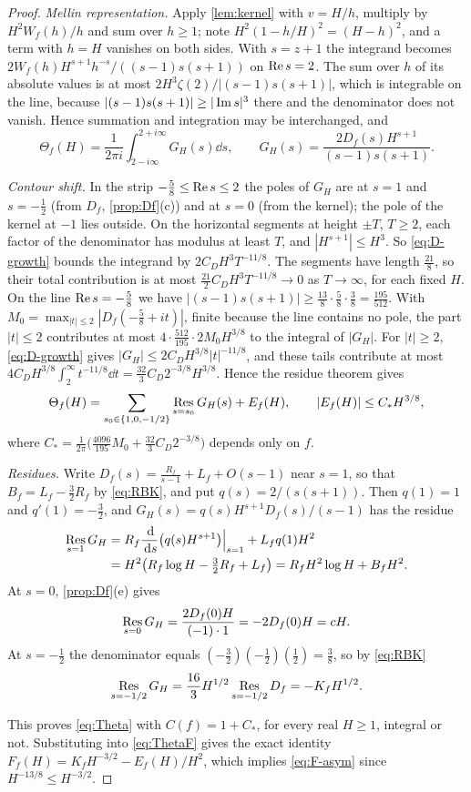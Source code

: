 \begin{proof}
\emph{Mellin representation.} Apply \cref{lem:kernel} with $v=H/h$, multiply by $H^2W_f(h)/h$ and sum over $h\ge1$; note $H^2(1-h/H)^2=(H-h)^2$, and a term with $h=H$ vanishes on both sides. With $s=z+1$ the integrand becomes $2W_f(h)H^{s+1}h^{-s}/((s-1)s(s+1))$ on $\operatorname{Re} s=2$. The sum over $h$ of its absolute values is at most $2H^3\zeta(2)/|(s-1)s(s+1)|$, which is integrable on the line, because $|(s-1)s(s+1)|\ge|\operatorname{Im} s|^3$ there and the denominator does not vanish. Hence summation and integration may be interchanged, and
\[
\Theta_f(H)=\frac1{2\pi i}\int_{2-i\infty}^{2+i\infty}G_H(s)\dd s,\qquad G_H(s)=\frac{2D_f(s)H^{s+1}}{(s-1)s(s+1)}.
\]

\emph{Contour shift.} In the strip $-\frac58\le\operatorname{Re} s\le2$ the poles of $G_H$ are at $s=1$ and $s=-\frac12$ (from $D_f$, \cref{prop:Df}(c)) and at $s=0$ (from the kernel); the pole of the kernel at $-1$ lies outside. On the horizontal segments at height $\pm T$, $T\ge2$, each factor of the denominator has modulus at least $T$, and $|H^{s+1}|\le H^3$. So \eqref{eq:D-growth} bounds the integrand by $2C_DH^3T^{-11/8}$. The segments have length $\frac{21}8$, so their total contribution is at most $\frac{21}2C_DH^3T^{-11/8}\to0$ as $T\to\infty$, for each fixed $H$. On the line $\operatorname{Re} s=-\frac58$ we have $|(s-1)s(s+1)|\ge\frac{13}8\cdot\frac58\cdot\frac38=\frac{195}{512}$. With $M_0=\max_{|t|\le2}|D_f(-\frac58+it)|$, finite because the line contains no pole, the part $|t|\le2$ contributes at most $4\cdot\frac{512}{195}\cdot2M_0H^{3/8}$ to the integral of $|G_H|$. For $|t|\ge2$, \eqref{eq:D-growth} gives $|G_H|\le2C_DH^{3/8}|t|^{-11/8}$, and these tails contribute at most $4C_DH^{3/8}\int_2^\infty t^{-11/8}\dd t=\frac{32}3C_D2^{-3/8}H^{3/8}$. Hence the residue theorem gives
\[
\Theta_f(H)=\sum_{s_0\in\{1,0,-1/2\}}\operatorname*{Res}_{s=s_0}G_H(s)+E_f(H),\qquad|E_f(H)|\le C_*H^{3/8},
\]
where $C_*=\frac1{2\pi}\bigl(\frac{4096}{195}M_0+\frac{32}3C_D2^{-3/8}\bigr)$ depends only on $f$.

\emph{Residues.} Write $D_f(s)=\frac{R_f}{s-1}+L_f+O(s-1)$ near $s=1$, so that $B_f=L_f-\frac32R_f$ by \eqref{eq:RBK}, and put $q(s)=2/(s(s+1))$. Then $q(1)=1$ and $q'(1)=-\frac32$, and $G_H(s)=q(s)H^{s+1}D_f(s)/(s-1)$ has the residue
\begin{align*}
\operatorname*{Res}_{s=1}G_H&=R_f\frac{\,\mathrm d}{\,\mathrm d s}\bigl(q(s)H^{s+1}\bigr)\Big|_{s=1}+L_fq(1)H^2\\
&=H^2\bigl(R_f\log H-\tfrac32R_f+L_f\bigr)=R_fH^2\log H+B_fH^2.
\end{align*}
At $s=0$, \cref{prop:Df}(e) gives
\[
\operatorname*{Res}_{s=0}G_H=\frac{2D_f(0)H}{(-1)\cdot1}=-2D_f(0)H=cH.
\]
At $s=-\frac12$ the denominator equals $(-\frac32)(-\frac12)(\frac12)=\frac38$, so by \eqref{eq:RBK}
\[
\operatorname*{Res}_{s=-1/2}G_H=\frac{16}3H^{1/2}\operatorname*{Res}_{s=-1/2}D_f=-K_fH^{1/2}.
\]

This proves \eqref{eq:Theta} with $C(f)=1+C_*$, for every real $H\ge1$, integral or not. Substituting into \eqref{eq:ThetaF} gives the exact identity $F_f(H)=K_fH^{-3/2}-E_f(H)/H^2$, which implies \eqref{eq:F-asym} since $H^{-13/8}\le H^{-3/2}$.
\end{proof}

